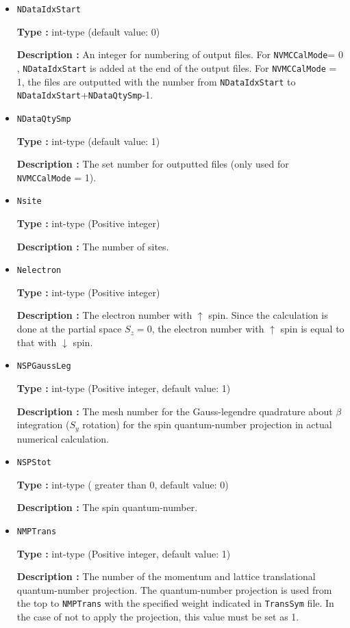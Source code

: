 \begin{itemize}
 \item  \verb|NDataIdxStart|

 {\bf Type :} int-type (default value: 0)

{\bf Description :} An integer for numbering of output files. For \verb|NVMCCalMode|= 0 , \verb|NDataIdxStart| is added at the end of the output files. For \verb|NVMCCalMode| = 1,  the files are outputted with the number from \verb|NDataIdxStart| to  \verb|NDataIdxStart|+\verb|NDataQtySmp|-1.
   
 \item  \verb|NDataQtySmp|

 {\bf Type :} int-type (default value: 1)

{\bf Description :} The set number for outputted files (only used for \verb|NVMCCalMode| = 1). 

 \item  \verb|Nsite|

{\bf Type :} int-type (Positive integer)

{\bf Description :} The number of sites.  

\item  \verb|Nelectron|

{\bf Type :} int-type (Positive integer)

{\bf Description :} The electron number with $\uparrow$ spin. Since the calculation is done at the partial space $S_z=0$,  the electron number with $\uparrow$ spin is equal to that with $\downarrow$ spin.

 \item  \verb|NSPGaussLeg|

{\bf Type :} {int-type (Positive integer, default value: 1)}

{\bf Description :} The mesh number for the Gauss-legendre quadrature about $\beta$ integration ($S_y$ rotation) for the spin quantum-number projection in actual numerical calculation.

 \item  \verb|NSPStot|

{\bf Type :} int-type ( greater than 0,  default value: 0)

{\bf Description :}   The spin quantum-number. 

 \item  \verb|NMPTrans|

{\bf Type :} int-type (Positive integer, default value: 1)

{\bf Description :} 
The number of the momentum and lattice translational quantum-number projection. The quantum-number projection is used from the top to \verb|NMPTrans| with the specified weight indicated in \verb|TransSym| file. In the case of not to apply the projection, this value must be set as 1.


\end{itemize}
